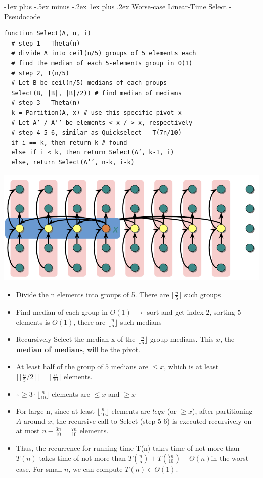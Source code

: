 \documentclass[10pt,landscape]{article}
\makeatletter
\newcommand{\subsubsubsection}{\@startsection{subsubsection}{3}{0mm}%
                                {-1ex plus -.5ex minus -.2ex}%
                                {1ex plus .2ex}%
                                {\normalfont\scriptsize\bfseries}}
\newcommand{\1}{\mathmybb{1}}
\newenvironment{tightcenter}{%
  \setlength\topsep{0pt}
  \setlength\parskip{0pt}
  \begin{center}
    }{%
  \end{center}
}
\makeatother
\begin{document}
\begin{multicols*}{3}
  \subsubsubsection{Worse-case Linear-Time Select - Pseudocode}
  \begin{lstlisting}
function Select(A, n, i)
  # step 1 - Theta(n)
  # divide A into ceil(n/5) groups of 5 elements each
  # find the median of each 5-elements group in O(1)
  # step 2, T(n/5)
  # Let B be ceil(n/5) medians of each groups
  Select(B, |B|, |B|/2)) # find median of medians
  # step 3 - Theta(n)
  k = Partition(A, x) # use this specific pivot x
  # Let A’ / A’’ be elements < x / > x, respectively
  # step 4-5-6, similar as Quickselect - T(7n/10)
  if i == k, then return k # found
  else if i < k, then return Select(A’, k-1, i)
  else, return Select(A’’, n-k, i-k)
  \end{lstlisting}  
  \begin{tightcenter}
    \includegraphics[width=0.98\linewidth]{images/medianofmedians.png} 
  \end{tightcenter}
  \begin{itemize}
    \item Divide the n elements into groups of 5. There are $\lfloor\frac{n}{5}\rfloor$ such groups
    \item Find median of each group in $O(1)$ $\rightarrow$ sort and get index $2$, sorting $5$ elements is $O(1)$, there are $\lfloor\frac{n}{5}\rfloor$ such medians
    \item Recursively Select the median x of the $\lfloor\frac{n}{5}\rfloor$ group medians. This $x$, the \textbf{median of medians}, will be the pivot.
    \item At least half of the group of $5$ medians are $\leq x$, which is at least $\lfloor\lfloor\frac{n}{5}/ 2 \rfloor\rfloor = \lfloor\frac{n}{10}\rfloor$ elements.
    \item $\therefore \geq 3 \cdot \lfloor \frac{n}{10} \rfloor$ elements are $\leq x$ and $\geq x$
    \item For large n, since at least $\lfloor \frac{n}{10} \rfloor$ elements are $leq x$ (or $\geq x$), after partitioning $A$ around $x$, the recursive call to Select (step 5-6) is executed recursively on at most $n - \frac{3n}{10} = \frac{7n}{10}$ elements.
    \item Thus, the recurrence for running time T(n) takes time of not more than $T(n)$  takes time of not more than $T(\frac{n}{5}) + T(\frac{7n}{10}) + \Theta(n)$in the worst case. For small $n$, we can compute $T(n) \in \Theta(1)$.
  \end{itemize}


\end{multicols*}
\end{document}
